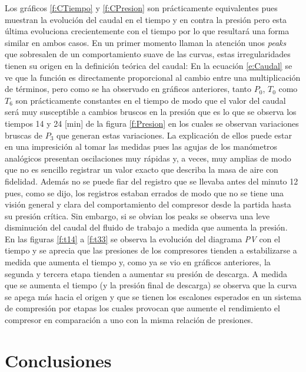 \documentclass[11pt,letterpaper]{extarticle}        %
\numberwithin{equation}{section}                    %
\begin{document}
Los gráficos \ref{f:CTiempo} y \ref{f:CPresion} son prácticamente equivalentes pues muestran la evolución del caudal en el tiempo y en contra la presión pero esta última evoluciona crecientemente con el tiempo por lo que resultará una forma similar en ambos casos. En un primer momento llaman la atención unos \textit{peaks} que sobresalen de un comportamiento suave de las curvas, estas irregularidades tienen su origen en la definición teórica del caudal: En la ecuación \ref{e:Caudal} se ve que la función es directamente proporcional al cambio entre una multiplicación de términos, pero como se ha observado en gráficos anteriores, tanto $P_0$, $T_0$ como $T_6$ son prácticamente constantes en el tiempo de modo que el valor del caudal será muy susceptible a cambios bruscos en la presión que es lo que se observa los tiempos 14 y 24 [min] de la figura \ref{f:Presion} en los cuales se observan variaciones bruscas de $P_3$ que generan estas variaciones. La explicación de ellos puede estar en una impresición al tomar las medidas pues las agujas de los manómetros analógicos presentan oscilaciones muy rápidas y, a veces, muy amplias de modo que no es sencillo registrar un valor exacto que describa la masa de aire con fidelidad. Además no se puede fiar del registro que se llevaba antes del minuto 12 pues, como se dijo, los registros estaban errados de modo que no se tiene una visión general y clara del comportamiento del compresor desde la partida hasta su presión crítica. Sin embargo, si se obvian los peaks se observa una leve disminución del caudal del fluido de trabajo a medida que aumenta la presión.\\

En las figuras \ref{f:t14} a \ref{f:t33} se observa la evolución del diagrama \textit{PV} con el tiempo y se aprecia que las presiones de los compresores tienden a estabilizarse a medida que aumenta el tiempo y, como ya se vio en gráficos anteriores, la segunda y tercera etapa tienden a aumentar su presión de descarga. A medida que se aumenta el tiempo (y la presión final de descarga) se observa que la curva se apega más hacia el origen y que se tienen los escalones esperados en un sistema de compresión por etapas los cuales provocan que aumente el rendimiento el compresor en comparación a uno con la misma relación de presiones.

\section{Conclusiones}
\end{document}

